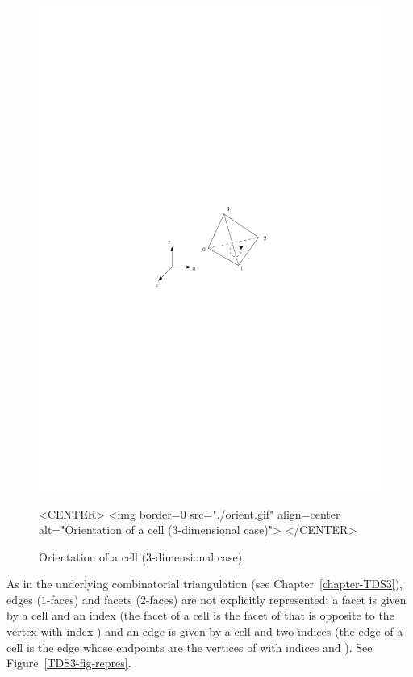 \begin{figure}[htbp]
\begin{ccTexOnly}
\begin{center} 
\includegraphics{Triangulation_3/orient} 
\end{center}
\end{ccTexOnly}
\begin{ccHtmlOnly}
<CENTER>
<img border=0 src="./orient.gif" align=center alt="Orientation of a cell 
(3-dimensional case)">
</CENTER>
\end{ccHtmlOnly}
\caption{Orientation of a cell (3-dimensional case).
\label{Triangulation3-fig-orient}}
\end{figure} 

As in the underlying combinatorial triangulation (see
Chapter~\ref{chapter-TDS3}), edges ($1$-faces) and facets ($2$-faces)
are not explicitly 
represented: a facet is given by a cell and an index (the facet
 of a cell  is the facet of  that is opposite to
the vertex with index ) and an edge is given by a cell and two
indices (the edge  of a cell  is the edge whose
endpoints are the vertices of  with indices  and
). See Figure~\ref{TDS3-fig-repres}.  

